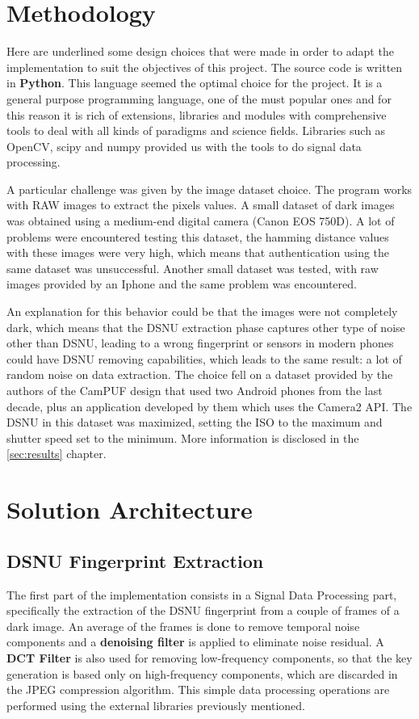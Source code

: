 \section{Methodology}
Here are underlined some design choices that were made in order to adapt the implementation to suit the objectives of this project.
The source code is written in \textbf{Python}. This language seemed the optimal choice for the project. It is a general purpose programming language, one of the must popular ones
and for this reason it is rich of extensions, libraries and modules with comprehensive tools to deal with all kinds of paradigms and science fields.
Libraries such as OpenCV, scipy and numpy provided us with the tools to do signal data processing.

A particular challenge was given by the image dataset choice. The program works with RAW images to extract the pixels values. A small dataset of dark images was obtained using a medium-end digital camera (Canon EOS 750D).
A lot of problems were encountered testing this dataset, the hamming distance values with these images were very high, which means that authentication using the same dataset was unsuccessful.
Another small dataset was tested, with raw images provided by an Iphone and the same problem was encountered. 

An explanation for this behavior could be that the images were not completely dark, which means that the DSNU extraction phase captures other type of noise other than DSNU,
leading to a wrong fingerprint or sensors in modern phones could have DSNU removing capabilities, which leads to the same result: a lot of random noise on data extraction.
The choice fell on a dataset provided by the authors of the CamPUF design that used two Android phones from the last decade, plus an application developed by them which uses the Camera2 API.
The DSNU in this dataset was maximized, setting the ISO to the maximum and shutter speed set to the minimum. More information is disclosed in the \ref{sec:results} chapter.

\section{Solution Architecture}
\subsection{DSNU Fingerprint Extraction}
The first part of the implementation consists in a Signal Data Processing part, specifically the extraction of the DSNU fingerprint from a couple of frames of a dark image. 
An average of the frames is done to remove temporal noise components and a \textbf{denoising filter} is applied to eliminate noise residual.
A \textbf{DCT Filter} is also used for removing low-frequency components, so that the key generation is based only on high-frequency components, which are discarded in the JPEG compression algorithm.
This simple data processing operations are performed using the external libraries previously mentioned.

